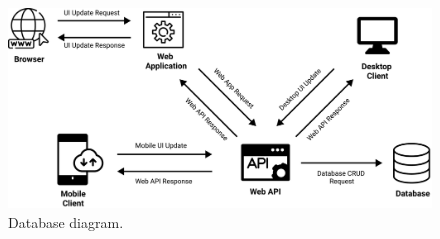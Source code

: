 %
%
%
%

\begin{figure}[H]
    \centering
    \includegraphics[width=1.2\textwidth]{Pictures/Threat_Modeling}
    \caption{Database diagram.}\label{fig:figure6}
\end{figure}

